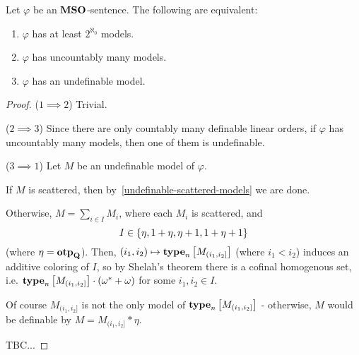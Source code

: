 \begin{theorem}\label{undefinable-models}
    Let $\varphi$ be an $\mathbf{MSO}$-sentence. The following are equivalent:
    \begin{enumerate}
        \item $\varphi$ has at least $2^{\aleph_0}$ models.
        \item $\varphi$ has uncountably many models.
        \item $\varphi$ has an undefinable model.
    \end{enumerate}
\end{theorem}

\begin{proof}
    ($1 \implies 2$) Trivial.

    ($2 \implies 3$) Since there are only countably many
    definable linear orders,
    if $\varphi$ has uncountably many models,
    then one of them is undefinable.

    ($3 \implies 1$)
    Let $M$ be an undefinable model of $\varphi$.

    If $M$ is scattered, then by~\cref{undefinable-scattered-models}
    we are done.

    Otherwise, $M = \sum_{i \in I} M_i$,
    where each $M_i$ is scattered, and
    \[I \in \left\{ {\eta, 1 + \eta, \eta + 1, 1 + \eta + 1} \right\}\]
    (where $\eta = \mathbf{otp}_{\mathbf{Q}}$).
    Then, $(i_1, i_2) \mapsto \mathbf{type}_{n} \left[ {M_{(i_1, i_2]}} \right]$ (where $i_1 < i_2$)
    induces an additive coloring of $I$, so by Shelah's theorem
    there is a cofinal homogenous set,
    i.e. $\mathbf{type}_{n} \left[ {M_{(i_1, i_2]}} \right] \cdot (\omega^\ast + \omega)$ for some
    $i_1, i_2 \in I$.

    Of course $M_{(i_1, i_2]}$ is not the only model of $\mathbf{type}_{n} \left[ {M_{(i_1, i_2]}} \right]$
    - otherwise, $M$ would be definable by $M = M_{(i_1, i_2]} * \eta$.

    TBC...
\end{proof}